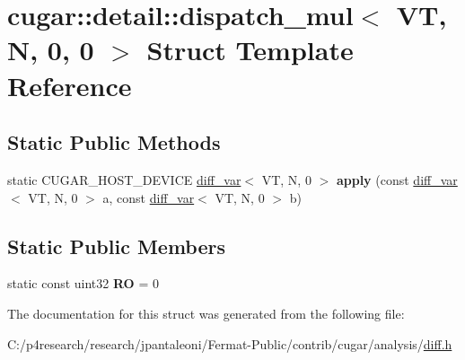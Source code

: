 \hypertarget{structcugar_1_1detail_1_1dispatch__mul_3_01_v_t_00_01_n_00_010_00_010_01_4}{}\section{cugar\+:\+:detail\+:\+:dispatch\+\_\+mul$<$ VT, N, 0, 0 $>$ Struct Template Reference}
\label{structcugar_1_1detail_1_1dispatch__mul_3_01_v_t_00_01_n_00_010_00_010_01_4}
\subsection*{Static Public Methods}
\begin{DoxyCompactItemize}
\item 
\mbox{\label{structcugar_1_1detail_1_1dispatch__mul_3_01_v_t_00_01_n_00_010_00_010_01_4_af1707edc55753ae225c9ba4045e509d6}} 
static C\+U\+G\+A\+R\+\_\+\+H\+O\+S\+T\+\_\+\+D\+E\+V\+I\+CE \hyperlink{structcugar_1_1diff__var}{diff\+\_\+var}$<$ VT, N, 0 $>$ {\bfseries apply} (const \hyperlink{structcugar_1_1diff__var}{diff\+\_\+var}$<$ VT, N, 0 $>$ a, const \hyperlink{structcugar_1_1diff__var}{diff\+\_\+var}$<$ VT, N, 0 $>$ b)
\end{DoxyCompactItemize}
\subsection*{Static Public Members}
\begin{DoxyCompactItemize}
\item 
\mbox{\label{structcugar_1_1detail_1_1dispatch__mul_3_01_v_t_00_01_n_00_010_00_010_01_4_a51704c3cbea4405a373f3509a8a717ed}} 
static const uint32 {\bfseries RO} = 0
\end{DoxyCompactItemize}


The documentation for this struct was generated from the following file\+:\begin{DoxyCompactItemize}
\item 
C\+:/p4research/research/jpantaleoni/\+Fermat-\/\+Public/contrib/cugar/analysis/\hyperlink{diff_8h}{diff.\+h}\end{DoxyCompactItemize}
